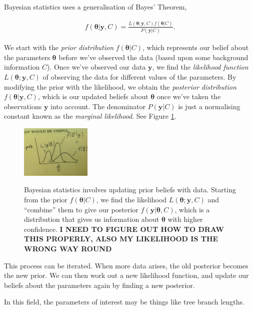 \documentclass[12pt]{article}
\begin{document}
Bayesian statistics uses a generalisation of Bayes' Theorem,

\begin{eqnarray}
  f(\bm{\theta}|\bm{y},C) = \frac{L(\bm{\theta};\bm{y},C)f(\bm{\theta}|C)}{P(\bm{y}|C)}.\label{BayesTheoremGen}
\end{eqnarray}

We start with the \emph{prior distribution} $f(\bm{\theta}|C)$, which represents our belief about the parameters $\bm{\theta}$ before we've observed the data (based upon some background information $C$). Once we've observed our data $\bm{y}$, we find the \emph{likelihood function} $L(\bm{\theta};\bm{y},C)$ of observing the data for different values of the parameters. By modifying the prior with the likelihood, we obtain the \emph{posterior distribution} $f(\bm{\theta}|\bm{y},C)$, which is our updated beliefs about $\bm{\theta}$ once we've taken the observations $\bm{y}$ into account. The denominator $P(\bm{y}|C)$ is just a normalising constant known as the \emph{marginal likelihood}. See Figure \ref{Triplot}.

\begin{figure}[h!]
  \centering
  	\includegraphics[width=0.3\textwidth]{figures/Triplot}\\[1.5cm]
        \caption{Bayesian statistics involves updating prior beliefs with data. Starting from the prior $f(\bm{\theta}|C)$, we find the likelihood $L(\bm{\theta};\bm{y},C)$ and ``combine'' them to give our posterior $f(\bm{y}|\bm{\theta},C)$, which is a distribution that gives us information about $\bm{\theta}$ with higher confidence. \textbf{I NEED TO FIGURE OUT HOW TO DRAW THIS PROPERLY, ALSO MY LIKELIHOOD IS THE WRONG WAY ROUND}} \label{Triplot}
\end{figure}


This process can be iterated. When more data arises, the old posterior becomes the new prior. We can then work out a new likelihood function, and update our beliefs about the parameters again by finding a new posterior.

In this field, the parameters of interest may be things like tree branch lengths.
\end{document}
